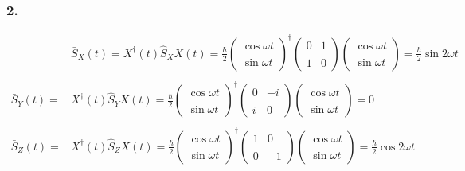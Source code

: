 \subsubsection{2.}
\begin{align}
\quad & \bar{S}_X(t) = X^{\dagger}(t) \hat{S}_X X(t) = \frac{\hbar}{2} 
\begin{pmatrix} \cos \omega t \\\\ \sin \omega t \end{pmatrix}^{\dagger} 
\begin{pmatrix} 0 & 1 \\\\ 1 & 0 \end{pmatrix}
\begin{pmatrix} \cos \omega t \\\\ \sin \omega t \end{pmatrix} = \frac{\hbar}{2} \sin 2\omega t \\\\
\bar{S}_Y(t) = & X^{\dagger}(t) \hat{S}_Y X(t) = \frac{\hbar}{2} 
\begin{pmatrix} \cos \omega t \\\\ \sin \omega t \end{pmatrix}^{\dagger} 
\begin{pmatrix} 0 & -i \\\\ i & 0 \end{pmatrix}
\begin{pmatrix} \cos \omega t \\\\ \sin \omega t \end{pmatrix} = 0 \\\\
\bar{S}_Z(t) = & X^{\dagger}(t) \hat{S}_Z X(t) = \frac{\hbar}{2} 
\begin{pmatrix} \cos \omega t \\\\ \sin \omega t \end{pmatrix}^{\dagger} 
\begin{pmatrix} 1 & 0 \\\\ 0 & -1 \end{pmatrix}
\begin{pmatrix} \cos \omega t \\\\  \sin \omega t \end{pmatrix} = \frac{\hbar}{2} \cos 2\omega t \\\\~
\end{align}
